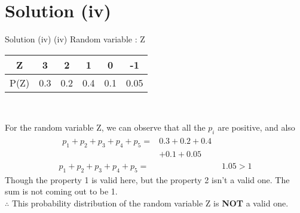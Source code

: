 \documentclass{beamer}
\begin{document}
\section{Solution (iv)}
\begin{frame}{Solution (iv)}
(iv) Random variable : Z
\begin{table}
\centering
\begin{tabular}{|c|c|c|c|c|c|}
\hline
    Z & 3 & 2 & 1 & 0 & -1 \\ 
\hline
    P(Z) & 0.3 & 0.2 & 0.4 & 0.1 & 0.05\\ 
\hline
\end{tabular}\\
\end{table}
\par For the random variable Z, we can observe that all the $p_i$ are positive, and also
 \begin{align}
 \begin{split}
p_1 + p_2 + p_3 + p_4 + p_5 ={}& 0.3 + 0.2 + 0.4 \\
                               &+ 0.1 + 0.05
 \end{split}\\
p_1 + p_2 + p_3 + p_4 + p_5 ={}& 1.05 > 1
 \end{align}
	      Though the property 1 is valid here, but the property 2 isn't a valid one. The sum is not coming out to be 1.\\
	      $\therefore$ This probability distribution of the random variable Z is \textbf{NOT} a valid one.
\end{frame}
\end{document}
